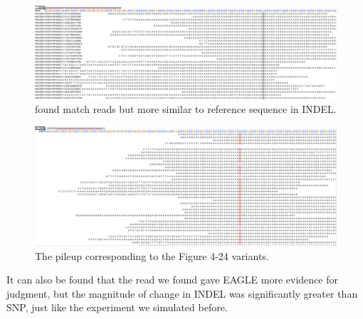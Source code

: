 \begin{figure}[H]
    \centering
    \includegraphics[width=1\columnwidth]{body/image/indel_new_REFread.png}
    \captionsetup{labelfont=bf}
    \renewcommand{\baselinestretch}{1.0}
    \vspace{-1cm}
    \caption[INDEL worse match reads]{ found match reads but more similar to reference sequence in INDEL.}
    \label{indel_new_REFread}
\end{figure}

\vspace{0.5cm}
\begin{figure}[H]
    \centering
    \includegraphics[width=1\columnwidth]{body/image/indel_pileup_REFread.png}
    \captionsetup{labelfont=bf}
    \renewcommand{\baselinestretch}{1.0}
    \vspace{-1cm}
    \caption[Figure 4.24 pileup]{The pileup corresponding to the Figure 4-24 variants.}
    \label{indel_pileup_REFread}
\end{figure}

It can also be found that the read we found gave EAGLE more evidence for judgment, but the magnitude of change in INDEL was significantly greater than SNP, just like the experiment we simulated before.

